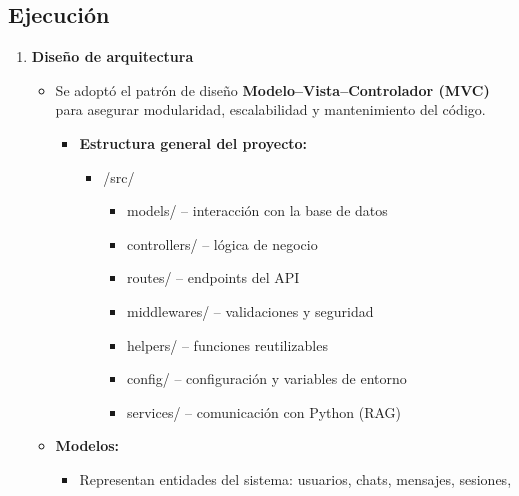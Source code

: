 \subsection{Ejecución}
\begin{enumerate}
      \item \textbf{Diseño de arquitectura}
            \begin{itemize}
                  \item Se adoptó el patrón de diseño \textbf{Modelo–Vista–Controlador (MVC)} para
                        asegurar modularidad, escalabilidad y mantenimiento del código.
                        \begin{itemize}
                              \item \textbf{Estructura general del proyecto:}
                                    \begin{itemize}
                                          \item /src/
                                                \begin{itemize}
                                                      \item models/ – interacción con la base de datos
                                                      \item controllers/ – lógica de negocio
                                                      \item routes/ – endpoints del API
                                                      \item middlewares/ – validaciones y seguridad
                                                      \item helpers/ – funciones reutilizables
                                                      \item config/ – configuración y variables de entorno
                                                      \item services/ – comunicación con Python (RAG)
                                                \end{itemize}
                                    \end{itemize}
                        \end{itemize}
                  \item \textbf{Modelos:}
                        \begin{itemize}
                              \item Representan entidades del sistema: usuarios, chats, mensajes, sesiones,

\end{itemize}
\end{itemize}
\end{enumerate}
